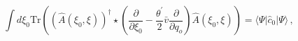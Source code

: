 \begin{equation}
\int d\xi _{0}\mathrm{Tr}\left( \left( \hat{A}(\xi _{0},\xi )\right)
^{\dagger }\star \left( {\frac{\partial }{\partial \xi _{0}}}-{\frac{\theta
^{\prime }}{2}}\bar{v}{\frac{\partial }{\partial q_{o}}}\right) \hat{A}(\xi
_{0},\xi )\right) =\langle \Psi |\hat{c}_{0}|\Psi \rangle \,,  \label{norm}
\end{equation}

